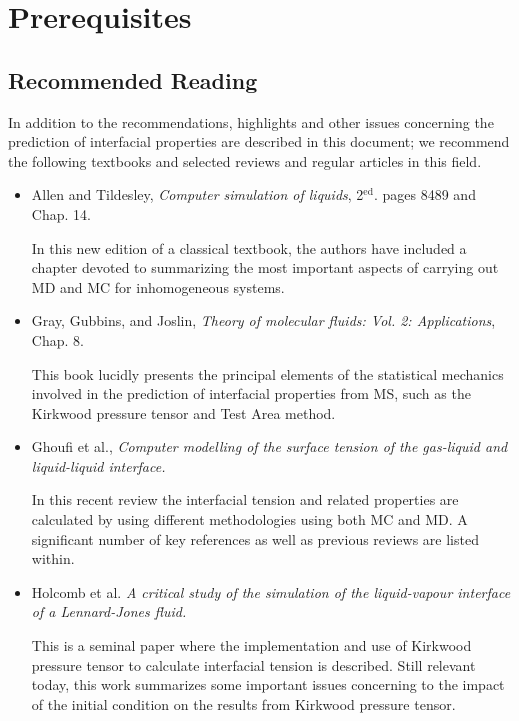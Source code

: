 \documentclass[9pt,tutorial]{livecoms}
\begin{document}
\section{Prerequisites}
\subsection{Recommended Reading}
In addition to the recommendations, highlights and other issues concerning the
prediction of interfacial properties are described in this document; we
recommend the following textbooks and selected reviews and regular articles in
this field. 

\begin{itemize}
  \item Allen and Tildesley, \textit{Computer simulation of liquids}, 2$^{\mathrm{ed}}$. pages 84\textendash{}89 and Chap. 14. \citep{allen2017}

In this new edition of a classical textbook, the authors have included a chapter devoted to summarizing the most important aspects of carrying out MD and MC for inhomogeneous systems.

\item Gray, Gubbins, and Joslin, \textit{Theory of molecular fluids: Vol. 2: Applications}, Chap. 8. \citep{gray2011}

This book lucidly presents the principal elements of the statistical mechanics involved in the prediction of interfacial properties from MS, such as the Kirkwood pressure tensor and Test Area method.

\item Ghoufi et al., \textit{Computer modelling of the surface tension of the gas-liquid and liquid-liquid interface.} \citep{ghoufi2016}

  In this recent review the interfacial tension and related properties are calculated by using different methodologies using both MC and MD. A significant number of key references as well as previous reviews are listed within.

\item Holcomb et al. \textit{A critical study of the simulation of the liquid-vapour
interface of a Lennard-Jones fluid.} \citep{holcomb1993}

  This is a 
  seminal paper where the implementation and use of Kirkwood pressure
  tensor to calculate interfacial tension is described. Still relevant today,
  this work summarizes some important issues concerning to the impact of the
  initial condition on the results from Kirkwood pressure tensor.


\end{itemize}
\end{document}
